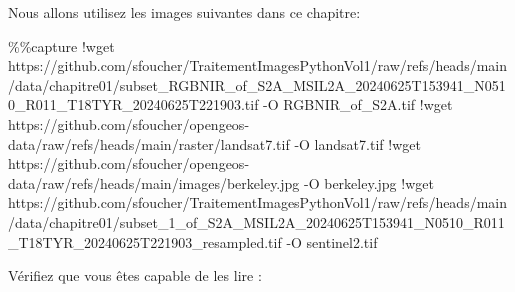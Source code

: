 \documentclass[
  11pt,
  letterpaper,
  open=any,
  twoside=false,
  french]{scrbook}
\newenvironment{Shaded}{\begin{snugshade}}{\end{snugshade}}
\newcommand{\NormalTok}[1]{\textcolor[rgb]{0.00,0.23,0.31}{#1}}
\newcommand{\OperatorTok}[1]{\textcolor[rgb]{0.37,0.37,0.37}{#1}}
\begin{document}
Nous allons utilisez les images suivantes dans ce chapitre:

\begin{Shaded}
\begin{Highlighting}[]
\OperatorTok{\%\%}\NormalTok{capture}
\OperatorTok{!}\NormalTok{wget https:}\OperatorTok{//}\NormalTok{github.com}\OperatorTok{/}\NormalTok{sfoucher}\OperatorTok{/}\NormalTok{TraitementImagesPythonVol1}\OperatorTok{/}\NormalTok{raw}\OperatorTok{/}\NormalTok{refs}\OperatorTok{/}\NormalTok{heads}\OperatorTok{/}\NormalTok{main}\OperatorTok{/}\NormalTok{data}\OperatorTok{/}\NormalTok{chapitre01}\OperatorTok{/}\NormalTok{subset\_RGBNIR\_of\_S2A\_MSIL2A\_20240625T153941\_N0510\_R011\_T18TYR\_20240625T221903.tif }\OperatorTok{{-}}\NormalTok{O RGBNIR\_of\_S2A.tif}
\OperatorTok{!}\NormalTok{wget https:}\OperatorTok{//}\NormalTok{github.com}\OperatorTok{/}\NormalTok{sfoucher}\OperatorTok{/}\NormalTok{opengeos}\OperatorTok{{-}}\NormalTok{data}\OperatorTok{/}\NormalTok{raw}\OperatorTok{/}\NormalTok{refs}\OperatorTok{/}\NormalTok{heads}\OperatorTok{/}\NormalTok{main}\OperatorTok{/}\NormalTok{raster}\OperatorTok{/}\NormalTok{landsat7.tif }\OperatorTok{{-}}\NormalTok{O landsat7.tif}
\OperatorTok{!}\NormalTok{wget https:}\OperatorTok{//}\NormalTok{github.com}\OperatorTok{/}\NormalTok{sfoucher}\OperatorTok{/}\NormalTok{opengeos}\OperatorTok{{-}}\NormalTok{data}\OperatorTok{/}\NormalTok{raw}\OperatorTok{/}\NormalTok{refs}\OperatorTok{/}\NormalTok{heads}\OperatorTok{/}\NormalTok{main}\OperatorTok{/}\NormalTok{images}\OperatorTok{/}\NormalTok{berkeley.jpg }\OperatorTok{{-}}\NormalTok{O berkeley.jpg}
\OperatorTok{!}\NormalTok{wget https:}\OperatorTok{//}\NormalTok{github.com}\OperatorTok{/}\NormalTok{sfoucher}\OperatorTok{/}\NormalTok{TraitementImagesPythonVol1}\OperatorTok{/}\NormalTok{raw}\OperatorTok{/}\NormalTok{refs}\OperatorTok{/}\NormalTok{heads}\OperatorTok{/}\NormalTok{main}\OperatorTok{/}\NormalTok{data}\OperatorTok{/}\NormalTok{chapitre01}\OperatorTok{/}\NormalTok{subset\_1\_of\_S2A\_MSIL2A\_20240625T153941\_N0510\_R011\_T18TYR\_20240625T221903\_resampled.tif }\OperatorTok{{-}}\NormalTok{O sentinel2.tif}
\end{Highlighting}
\end{Shaded}

Vérifiez que vous êtes capable de les lire :
\end{document}
